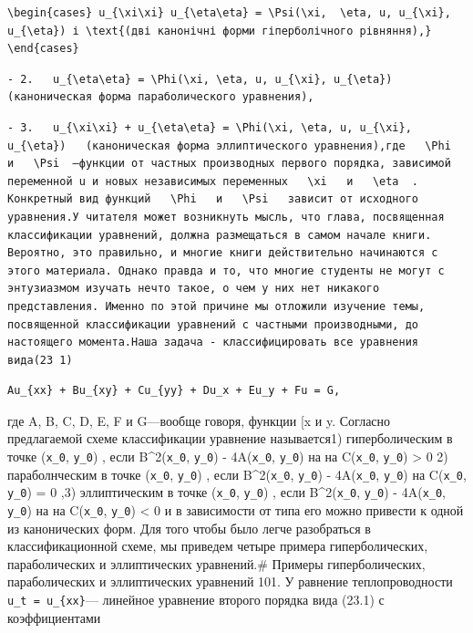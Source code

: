 \documentclass[
  ukrainian,
]{article}
\begin{document}
\begin{verbatim}
\begin{cases} u_{\xi\xi} u_{\eta\eta} = \Psi(\xi,  \eta, u, u_{\xi}, u_{\eta}) і \text{(дві канонічні форми гіперболічного рівняння),} \end{cases}
\end{verbatim}

\begin{verbatim}
- 2.   u_{\eta\eta} = \Phi(\xi, \eta, u, u_{\xi}, u_{\eta})   (каноническая форма параболического уравнения),
\end{verbatim}

\begin{verbatim}
- 3.   u_{\xi\xi} + u_{\eta\eta} = \Phi(\xi, \eta, u, u_{\xi}, u_{\eta})   (каноническая форма эллиптического уравнения),где   \Phi   и   \Psi  —функции от частных производных первого порядка, зависимой переменной u и новых независимых переменных   \xi   и   \eta  . Конкретный вид функций   \Phi   и   \Psi   зависит от исходного уравнения.У читателя может возникнуть мысль, что глава, посвященная классификации уравнений, должна размещаться в самом начале книги. Вероятно, это правильно, и многие книги действительно начинаются с этого материала. Однако правда и то, что многие студенты не могут с энтузиазмом изучать нечто такое, о чем у них нет никакого представления. Именно по этой причине мы отложили изучение темы, посвященной классификации уравнений с частными производными, до настоящего момента.Наша задача - классифицировать все уравнения вида(23 1)
\end{verbatim}

\begin{verbatim}
Au_{xx} + Bu_{xy} + Cu_{yy} + Du_x + Eu_y + Fu = G,
\end{verbatim}

где A, B, C, D, E, F и G---вообще говоря, функции {[}x и y. Согласно
предлагаемой схеме классификации уравнение называется1) гиперболическим
в точке (\texttt{x\_0}, \texttt{y\_0}) , если B\^{}2(\texttt{x\_0},
\texttt{y\_0}) - 4A(\texttt{x\_0}, \texttt{y\_0})  на
 на C(\texttt{x\_0}, \texttt{y\_0}) \textgreater{} 0 2)
параболнческим в точке (\texttt{x\_0}, \texttt{y\_0}) , если
B\^{}2(\texttt{x\_0}, \texttt{y\_0}) - 4A(\texttt{x\_0}, \texttt{y\_0})
 на C(\texttt{x\_0}, \texttt{y\_0}) = 0 ,3) эллиптическим в
точке (\texttt{x\_0}, \texttt{y\_0}) , если B\^{}2(\texttt{x\_0},
\texttt{y\_0}) - 4A(\texttt{x\_0}, \texttt{y\_0})  на
 на C(\texttt{x\_0}, \texttt{y\_0}) \textless{} 0 и в
зависимости от типа его можно привести к одной из канонических форм. Для
того чтобы было легче разобраться в классификационной схеме, мы приведем
четыре примера гиперболических, параболических и эллиптических
уравнений.\# Примеры гиперболических, параболических и эллиптических
уравнений 101. У равнение теплопроводности
\texttt{u\_t\ =\ u\_\{xx\}}--- линейное уравнение второго порядка вида
(23.1) с коэффициентами
\end{document}
